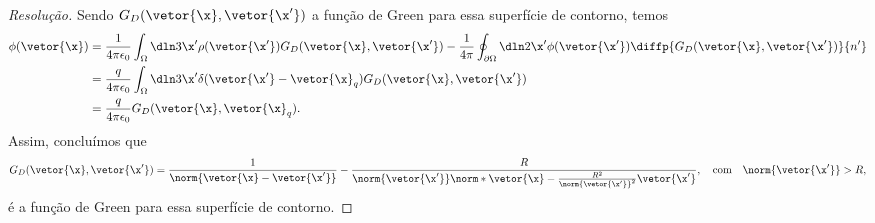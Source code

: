 \begin{proof}[Resolução]
    Sendo \(G_D(\vetor{\x}, \vetor{\x'})\) a função de Green para essa superfície de contorno, temos
    \begin{align*}
        \phi(\vetor{\x}) &= \frac{1}{4\pi \epsilon_0}\int_{\Omega} \dln3{\x'} \rho(\vetor{\x'})G_D(\vetor{\x}, \vetor{\x'}) - \frac1{4\pi}\oint_{\partial \Omega}\dln2{\x'} \phi(\vetor{\x'})\diffp{G_D(\vetor{\x}, \vetor{\x'})}{n'}\\
                         &= \frac{q}{4\pi \epsilon_0} \int_{\Omega} \dln3{\x'} \delta(\vetor{\x'}-\vetor{\x}_q)G_D(\vetor{\x}, \vetor{\x'})\\
                         &= \frac{q}{4\pi \epsilon_0} G_D(\vetor{\x}, \vetor{\x}_q).
    \end{align*}
    Assim, concluímos que
    \begin{equation*}
        G_D(\vetor{\x}, \vetor{\x'}) = \frac{1}{\norm{\vetor{\x} - \vetor{\x'}}} - \frac{R}{\norm{\vetor{\x'}}\norm*{\vetor{\x} - \frac{R^2}{\norm{\vetor{\x'}}^2}\vetor{\x'}}},
        \quad\text{com}\quad
        \norm{\vetor{\x'}} > R,
    \end{equation*}
    é a função de Green para essa superfície de contorno.


\end{proof}
